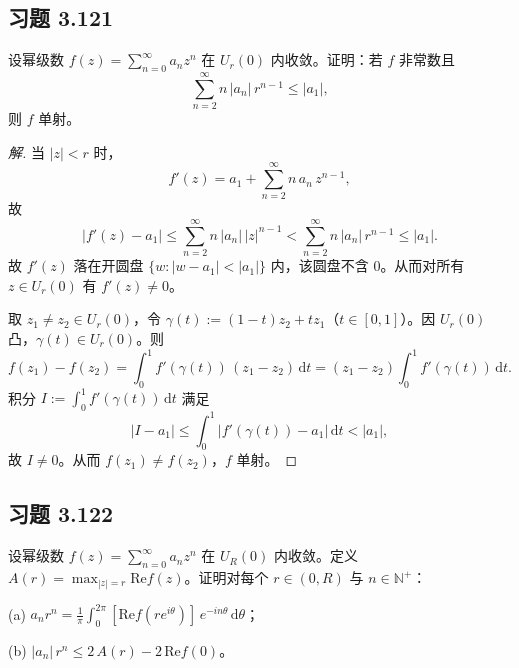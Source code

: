 \documentclass[11pt,a4paper]{article}
\newcommand{\N}{\mathbb{N}}
\renewcommand{\Re}{\mathrm{Re}}
\newcommand{\dd}{\mathrm{d}}
\theoremstyle{definition}
\newenvironment{solution}{\begin{proof}[解]}{\end{proof}}
\begin{document}
\subsection{习题 3.121}

设幂级数 $f(z) = \sum_{n=0}^{\infty} a_n z^n$ 在 $U_r(0)$ 内收敛。证明：若 $f$ 非常数且
\[
  \sum_{n=2}^{\infty} n\,|a_n|\,r^{n-1} \le |a_1|,
\]
则 $f$ 单射。

\begin{solution}
  当 $|z| < r$ 时，
  \[
    f'(z) = a_1 + \sum_{n=2}^{\infty} n\,a_n\,z^{n-1},
  \]
  故
  \[
    |f'(z) - a_1|
    \le \sum_{n=2}^{\infty} n\,|a_n|\,|z|^{n-1}
    < \sum_{n=2}^{\infty} n\,|a_n|\,r^{n-1}
    \le |a_1|.
  \]
  故 $f'(z)$ 落在开圆盘 $\{w : |w - a_1| < |a_1|\}$ 内，该圆盘不含 $0$。从而对所有 $z \in U_r(0)$ 有 $f'(z) \ne 0$。

  取 $z_1 \ne z_2 \in U_r(0)$，令 $\gamma(t) := (1-t)z_2 + tz_1$（$t \in [0,1]$）。因 $U_r(0)$ 凸，$\gamma(t) \in U_r(0)$。则
  \[
    f(z_1) - f(z_2)
    = \int_0^1 f'(\gamma(t))\,(z_1 - z_2)\,\dd t
    = (z_1 - z_2)\int_0^1 f'(\gamma(t))\,\dd t.
  \]
  积分 $I := \int_0^1 f'(\gamma(t))\,\dd t$ 满足
  \[
    |I - a_1|
    \le \int_0^1 |f'(\gamma(t)) - a_1|\,\dd t
    < |a_1|,
  \]
  故 $I \ne 0$。从而 $f(z_1) \ne f(z_2)$，$f$ 单射。\qedhere
\end{solution}

\subsection{习题 3.122}

设幂级数 $f(z) = \sum_{n=0}^{\infty} a_n z^n$ 在 $U_R(0)$ 内收敛。定义 $A(r) = \max_{|z|=r} \Re f(z)$。证明对每个 $r \in (0, R)$ 与 $n \in \N^+$：

(a) $\displaystyle a_n r^n
= \frac{1}{\pi}\int_0^{2\pi}
[\Re f(r e^{i\theta})]\,e^{-in\theta}\,\dd\theta$；

(b) $|a_n|\,r^n \le 2\,A(r) - 2\,\Re f(0)$。
\end{document}
